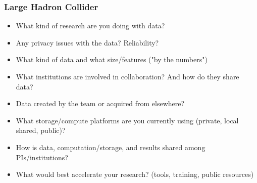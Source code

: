\begin{frame}
\frametitle{Large Hadron Collider}

\begin{itemize}
\item What kind of research are you doing with data?
\item Any privacy issues with the data? Reliability?
\item What kind of data and what size/features ("by the numbers")
\item What institutions are involved in collaboration? And how do they share data?
\item Data created by the team or acquired from elsewhere?
\item What storage/compute platforms are you currently using (private, local shared, public)?
\item How is data, computation/storage, and results shared among PIs/institutions?
\item What would best accelerate your research? (tools, training, public resources)
\end{itemize}

\end{frame}


